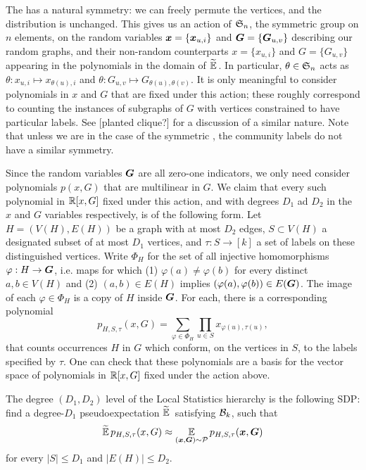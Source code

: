 The \model has a natural symmetry: we can freely permute the vertices, and the distribution is unchanged. This gives us an action of $\mathfrak{S}_n$, the symmetric group on $n$ elements, on the random variables ${\boldsymbol{x}} = \{{\boldsymbol{x}}_{u,i}\}$ and $\boldsymbol{G} = \{\boldsymbol{G}_{u,v}\}$ describing our random graphs, and their non-random counterparts $x = \{x_{u,i}\}$ and $G = \{G_{u,v}\}$ appearing in the polynomials in the domain of $\widetilde{\operatorname*{\mathbb{E}}}\,$. In particular, $\theta\in\mathfrak{S}_n$ acts as $\theta : x_{u,i} \mapsto x_{\theta(u),i}$ and $\theta : G_{u,v} \mapsto G_{\theta(u),\theta(v)}$. It is only meaningful to consider polynomials in $x$ and $G$ that are fixed under this action; these roughly correspond to counting the instances of subgraphs of $G$ with vertices constrained to have particular labels. See [planted clique?] for a discussion of a similar nature. Note that unless we are in the case of the symmetric \model, the community labels do not have a similar symmetry.

Since the random variables $\boldsymbol{G}$ are all zero-one indicators, we only need consider polynomials $p(x,G)$ that are multilinear in $G$. We claim that every such polynomial in $\mathbb{R}[x,G]$ fixed under this action, and with degrees $D_1$ ad $D_2$ in the $x$ and $G$ variables respectively, is of the following form. Let $H = (V(H),E(H))$ be a graph with at most $D_2$ edges, $S\subset V(H)$ a designated subset of at most $D_1$ vertices, and $\tau: S \to [k]$ a set of labels on these distinguished vertices. Write $\Phi_H$ for the set of all injective homomorphisms $\varphi: H \to \boldsymbol{G}$, i.e. maps for which (1) $\varphi(a)\neq\varphi(b)$ for every distinct $a,b\in V(H)$ and (2) $(a,b)\in E(H)$ implies $(\varphi(a),\varphi(b)) \in E(\boldsymbol{G})$. The image of each $\varphi \in \Phi_H$ is a copy of $H$ inside $\boldsymbol{G}$. For each, there is a corresponding polynomial
\begin{equation} \label{eq:graph-poly}
	p_{H,S,\tau}(x,G) = \sum_{\varphi\in\Phi_H}\prod_{u\in S} x_{\varphi(u),\tau(u)},
\end{equation}
that counts occurrences $H$ in $G$ which conform, on the vertices in $S$, to the labels specified by $\tau$. One can check that these polynomials are a basis for the vector space of polynomials in $\mathbb{R}[x,G]$ fixed under the action above.

\begin{definition}
    The degree $(D_1,D_2)$ level of the Local Statistics hierarchy is the following SDP: find a degree-$D_1$ pseudoexpectation $\widetilde{\operatorname*{\mathbb{E}}}\,$ satisfying $\mathcal{B}_k$, such that
    \begin{align} \label{eq:lost-sdp}
    	\widetilde{\operatorname*{\mathbb{E}}}\, p_{H,S,\tau}(x,G) \approx \operatorname*{\mathbb{E}}_{({\boldsymbol{x}},\boldsymbol{G})\sim \mathcal{P}} p_{H,S,\tau}({\boldsymbol{x}},\boldsymbol{G})
    \end{align}
    for every $|S| \le D_1$ and $|E(H)| \le D_2$.
\end{definition}

